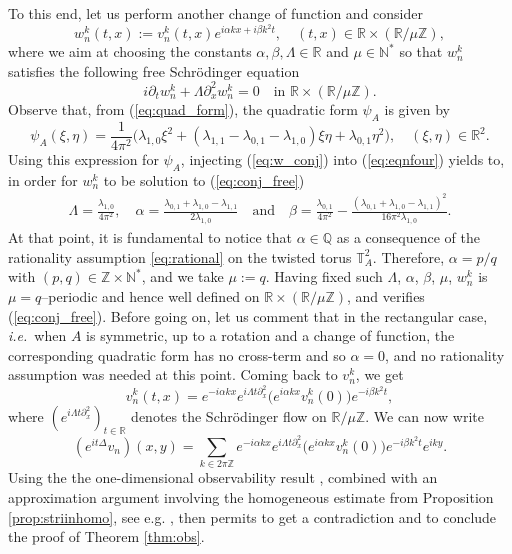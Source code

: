 \documentclass[a4paper,11pt]{amsart}
\numberwithin{equation}{section}
\theoremstyle{definition}
\newcommand{\twotorus}{\mathbb T^2_A}
\begin{document}
To this end, let us perform another change of function and consider
\begin{equation}\label{eq:w_conj}
	w^k_n(t,x) := v^k_n(t,x)e^{i\alpha kx + i\beta k^2t},\quad (t,x)\in\mathbb R\times(\mathbb R/\mu\mathbb Z),
\end{equation}
where we aim at choosing the constants $\alpha,\beta, \Lambda\in\mathbb R$ and $\mu \in \mathbb N^*$ so that $w^k_n$ satisfies the following free Schr\"odinger equation 
\begin{equation} \label{eq:conj_free}
	i\partial_t w^k_n + \Lambda\partial^2_x w^k_n = 0\quad\text{in $\mathbb R\times(\mathbb R/\mu\mathbb Z)$}.
\end{equation}
Observe that, from (\ref{eq:quad_form}), the quadratic form $\psi_A$ is given by
$$
\psi_A(\xi,\eta) = \frac1{4\pi^2}\big(\lambda_{1,0}\xi^2 + (\lambda_{1,1} - \lambda_{0,1} - \lambda_{1,0}) \xi\eta +\lambda_{0,1}\eta^2\big),\quad(\xi,\eta)\in\mathbb R^2.
$$
Using this expression for $\psi_A$, injecting (\ref{eq:w_conj}) into (\ref{eq:eqnfour}) yields to, in order for $w_n^k$ to be solution to (\ref{eq:conj_free})
\begin{align*}
	\Lambda = \frac{\lambda_{1,0}}{4\pi^2},\quad \alpha = \frac{\lambda_{0,1} + \lambda_{1,0} - \lambda_{1,1}}{2\lambda_{1,0}}
	\quad\text{and}\quad\beta = \frac{\lambda_{0,1}}{4\pi^2} - \frac{(\lambda_{0,1}+\lambda_{1,0}-\lambda_{1,1})^2}{16\pi^2\lambda_{1,0}}.
\end{align*}
At that point, it is fundamental to notice that $\alpha\in\mathbb Q$ as a consequence of the rationality assumption \eqref{eq:rational} on the twisted torus $\twotorus$. Therefore, $\alpha = p/q$ with $(p,q) \in \mathbb Z \times \mathbb N^*$, and we take $\mu := q$. Having fixed such $\Lambda$, $\alpha$, $\beta$, $\mu$, $w_n^k$ is $\mu=q$--periodic and hence well defined on $\mathbb R\times(\mathbb R/\mu\mathbb Z)$, and verifies (\ref{eq:conj_free}).
Before going on, let us comment that in the rectangular case, \textit{i.e.}~when $A$ is symmetric, up to a rotation and a change of function, the corresponding quadratic form has no cross-term and so $\alpha = 0$, and no rationality assumption was needed at this point.
Coming back to $v_n^k$, we get
$$
v_n^k(t,x) = e^{-i\alpha k x} e^{i\Lambda t \partial_x^2}\big( e^{i\alpha k x} v_n^k(0) \big) e^{-i\beta k^2 t},
$$
where $(e^{i\Lambda t \partial_x^2})_{t\in\mathbb R}$ denotes the Schr\"odinger flow on $\mathbb R/\mu\mathbb Z$. We can now write
$$
    (e^{it\Delta}v_n)(x,y) = \sum_{k\in2\pi\mathbb Z} e^{-i\alpha k x} e^{i\Lambda t \partial_x^2}\big( e^{i\alpha k x} v_n^k(0) \big) e^{-i\beta k^2 t} e^{iky}.
$$
Using the the one-dimensional observability result \cite[Lemma 2.4]{BZ}, combined with an approximation argument involving
the homogeneous estimate from Proposition \ref{prop:striinhomo}, see e.g. \cite[pp. 337 - 338]{BZ}, then permits to get a contradiction and to conclude the proof of Theorem \ref{thm:obs}.
\end{document}
